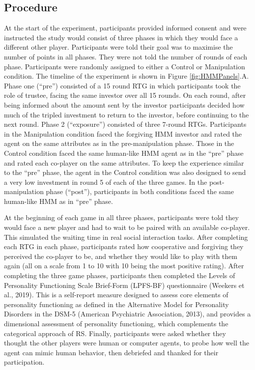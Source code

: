 \documentclass[
]{article}
\begin{document}
\subsection{Procedure}\label{procedure}

At the start of the experiment, participants provided informed consent
and were instructed the study would consist of three phases in which
they would face a different other player. Participants were told their
goal was to maximise the number of points in all phases. They were not
told the number of rounds of each phase. Participants were randomly
assigned to either a Control or Manipulation condition. The timeline of
the experiment is shown in Figure \ref{fig:HMMPanels}.A. Phase one
(``pre'') consisted of a 15 round RTG in which participants took the role
of trustee, facing the same investor over all 15 rounds. On each round,
after being informed about the amount sent by the investor participants
decided how much of the tripled investment to return to the investor,
before continuing to the next round. Phase 2 (``exposure'') consisted of
three 7-round RTGs. Participants in the Manipulation condition faced the
forgiving HMM investor and rated the agent on the same attributes as in
the pre-manipulation phase. Those in the Control condition faced the
same human-like HMM agent as in the ``pre'' phase and rated each co-player
on the same attributes. To keep the experience similar to the ``pre''
phase, the agent in the Control condition was also designed to send a
very low investment in round 5 of each of the three games. In the
post-manipulation phase (``post''), participants in both conditions faced
the same human-like HMM as in ``pre'' phase.

At the beginning of each game in all three phases, participants were
told they would face a new player and had to wait to be paired with an
available co-player. This simulated the waiting time in real social
interaction tasks. After completing each RTG in each phase, participants
rated how cooperative and forgiving they perceived the co-player to be,
and whether they would like to play with them again (all on a scale from
1 to 10 with 10 being the most positive rating). After completing the
three game phases, participants then completed the Levels of Personality
Functioning Scale Brief-Form (LPFS-BF) questionnaire
(Weekers et al., 2019). This is a self-report measure designed to assess
core elements of personality functioning as defined in the Alternative
Model for Personality Disorders in the DSM-5
(American Psychiatric Association, 2013), and provides a
dimensional assessment of personality functioning, which complements the
categorical approach of RS. Finally, participants were asked whether
they thought the other players were human or computer agents, to probe
how well the agent can mimic human behavior, then debriefed and thanked
for their participation.
\end{document}
